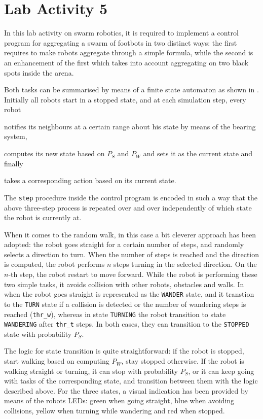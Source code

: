 \section{Lab Activity 5}

In this lab activity on swarm robotics, it is required to implement a control
program for aggregating a swarm of footbots in two distinct ways: the first
requires to make robots aggregate through a simple formula, while the second is
an enhancement of the first which takes into account aggregating on two black
spots inside the arena.

Both tasks can be summarised by means of a finite state automaton as shown in
. Initially all robots start in a stopped state, and at
each simulation step, every robot
\begin{enumerate*}[label=(\emph{\roman{*}})]
    \item notifies its neighbours at a certain range about his state by means
        of the bearing system,
    \item computes its new state based on $P_S$ and $P_W$ and sets it as the
        current state and finally
    \item takes a corresponding action based on its current state.
\end{enumerate*}
%
The \texttt{step} procedure inside the control program is encoded in such a way
that the above three-step process is repeated over and over independently of
which state the robot is currently at.

When it comes to the random walk, in this case a bit cleverer approach has been
adopted: the robot goes straight for a certain number of steps, and randomly
selects a direction to turn. When the number of steps is reached and the
direction is computed, the robot performs $n$ steps turning in the selected
direction. On the $n$-th step, the robot restart to move forward. While the
robot is performing these two simple tasks, it avoids collision with other
robots, obstacles and walls. In  when the robot goes
straight is represented as the \texttt{WANDER} state, and it transtion to the
\texttt{TURN} state if a collision is detected or the number of wandering steps
is reached (\texttt{thr\_w}), whereas in state \texttt{TURNING} the robot
transition to state \texttt{WANDERING} after \texttt{thr\_t} steps. In both
cases, they can transition to the \texttt{STOPPED} state with probability
$P_S$.

The logic for state transition is quite straightforward: if the robot is
stopped, start walking based on computing $P_W$, stay stopped otherwise. If the
robot is walking straight or turning, it can stop with probability $P_S$, or it
can keep going with tasks of the corresponding state, and transition between
them with the logic described above. For the three states, a visual indication
has been provided by means of the robots LEDs: green when going straight, blue
when avoiding collisions, yellow when turning while wandering and red when
stopped.

